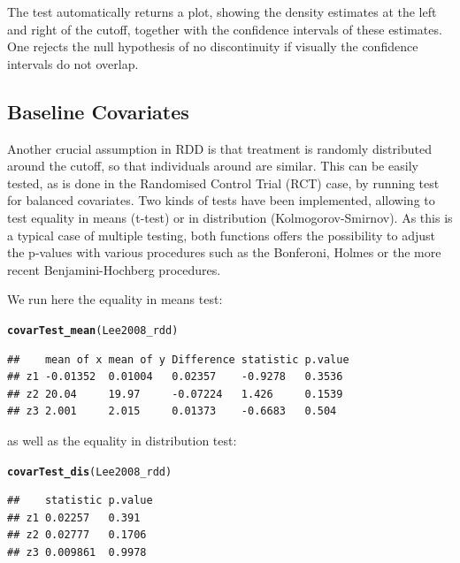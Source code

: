 \documentclass[english,nojss]{jss}\usepackage{graphicx, color}
\makeatletter
\newcommand{\hlfunctioncall}[1]{\textcolor[rgb]{0.501960784313725,0,0.329411764705882}{\textbf{#1}}}%
\newenvironment{kframe}{%
 \def\at@end@of@kframe{}%
 \ifinner\ifhmode%
  \def\at@end@of@kframe{\end{minipage}}%
  \begin{minipage}{\columnwidth}%
 \fi\fi%
 \def\FrameCommand##1{\hskip\@totalleftmargin \hskip-\fboxsep
 \colorbox{shadecolor}{##1}\hskip-\fboxsep
     \hskip-\linewidth \hskip-\@totalleftmargin \hskip\columnwidth}%
 \MakeFramed {\advance\hsize-\width
   \@totalleftmargin\z@ \linewidth\hsize
   \@setminipage}}%
 {\par\unskip\endMakeFramed%
 \at@end@of@kframe}
\newenvironment{knitrout}{}{} %
\makeatother
\begin{document}
The test automatically returns a plot, showing the density estimates
at the left and right of the cutoff, together with the confidence
intervals of these estimates. One rejects the null hypothesis of no
discontinuity if visually the confidence intervals do not overlap. 


\subsection{Baseline Covariates}

Another crucial assumption in RDD is that treatment is randomly distributed
around the cutoff, so that individuals around are similar. This can
be easily tested, as is done in the Randomised Control Trial (RCT)
case, by running test for balanced covariates. Two kinds of tests
have been implemented, allowing to test equality in means (t-test)
or in distribution (Kolmogorov-Smirnov). As this is a typical case
of multiple testing, both functions offers the possibility to adjust
the p-values with various procedures such as the Bonferoni, Holmes
or the more recent Benjamini-Hochberg procedures. 

We run here the equality in means test:

\begin{knitrout}
\color{fgcolor}\begin{kframe}
\begin{alltt}
\hlfunctioncall{covarTest_mean}(Lee2008_rdd)
\end{alltt}
\begin{verbatim}
##    mean of x mean of y Difference statistic p.value
## z1 -0.01352  0.01004   0.02357    -0.9278   0.3536 
## z2 20.04     19.97     -0.07224   1.426     0.1539 
## z3 2.001     2.015     0.01373    -0.6683   0.504
\end{verbatim}
\end{kframe}
\end{knitrout}


as well as the equality in distribution test:

\begin{knitrout}
\color{fgcolor}\begin{kframe}
\begin{alltt}
\hlfunctioncall{covarTest_dis}(Lee2008_rdd)
\end{alltt}


{\ttfamily\noindent\color{warningcolor}{\#\# Warning: p-values will be approximate in the presence of ties}}\begin{verbatim}
##    statistic p.value
## z1 0.02257   0.391  
## z2 0.02777   0.1706 
## z3 0.009861  0.9978
\end{verbatim}
\end{kframe}
\end{knitrout}
\end{document}
